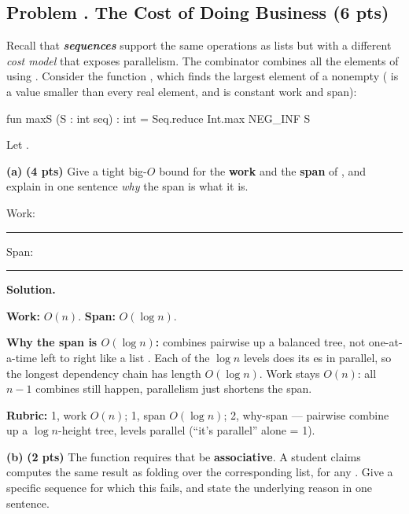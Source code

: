 \documentclass[crop=false]{standalone}
\newif\ifsol
\newenvironment{solution}
    {\par\color{solution_color}\begin{framed}\textbf{Solution.}\par}
    {\end{framed}}
\newcommand{\term}[1]{\textbf{\textit{#1}}}
\newcommand{\quizproblem}[3]{%
  \needspace{5\baselineskip}%
  \stepcounter{problem}%
  \ifsol
    \subsection*{Problem \arabic{problem}. #1 \hfill \timing{#2} \quad (#3 pts)}%
  \else
    \subsection*{Problem \arabic{problem}. #1 \hfill (#3 pts)}%
  \fi
}
\newcommand{\subpts}[1]{\textbf{(#1 pts)}}
\newcommand{\answerspace}[1]{\ifsol\else\vspace{#1}\par\fi}
\begin{document}
\quizproblem{The Cost of Doing Business}{7}{6}

Recall that \term{sequences} support the same operations as lists but
with a different \emph{cost model} that exposes parallelism. The
combinator  combines all the elements of 
using . Consider the function , which finds the
largest element of a nonempty  ( is a value
smaller than every real element, and  is constant work and
span):

\begin{codeblock}
  fun maxS (S : int seq) : int = Seq.reduce Int.max NEG_INF S
\end{codeblock}

Let .

\textbf{(a)} \subpts{4} Give a tight big-$O$ bound for the \textbf{work}
and the \textbf{span} of , and explain in one sentence
\emph{why} the span is what it is.

\vspace{0.3em}
\hspace{2em}Work: \rule{5cm}{0.4pt} \qquad Span: \rule{5cm}{0.4pt}

\answerspace{4cm}

\begin{solution}
\textbf{Work:} $O(n)$. \qquad \textbf{Span:} $O(\log n)$.

\textbf{Why the span is $O(\log n)$:}  combines pairwise up
a balanced tree, not one-at-a-time left to right like a list .
Each of the $\log n$ levels does its es in parallel, so the
longest dependency chain has length $O(\log n)$. Work stays $O(n)$: all
$n - 1$ combines still happen, parallelism just shortens the span.

\textbf{Rubric:} 1, work $O(n)$; 1, span $O(\log n)$; 2, why-span ---
pairwise combine up a $\log n$-height tree, levels parallel (``it's
parallel'' alone = 1).
\end{solution}

\textbf{(b)} \subpts{2} The function  requires that
 be \textbf{associative}. A student claims  computes the same result as folding  over the
corresponding list, for any . Give a specific sequence 
for which this fails, and state the underlying reason in one sentence.

\answerspace{3.5cm}
\end{document}

